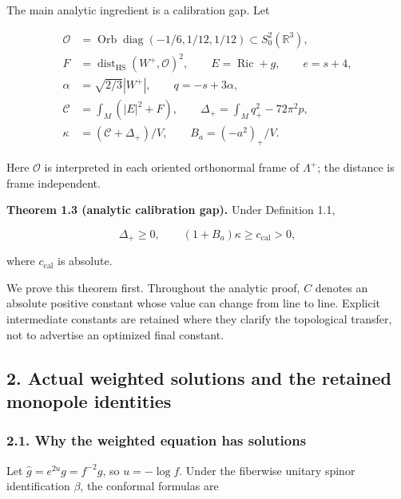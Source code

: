 \documentclass[
  10pt,
]{article}
\begin{document}
The main analytic ingredient is a calibration gap. Let

\[
 \begin{aligned}
 \mathcal O&=\operatorname{Orb}\operatorname{diag}
                    (-1/6,1/12,1/12)\subset S^2_0(\mathbb R^3),\\
 F&=\operatorname{dist}_{\mathrm{HS}}(W^+,\mathcal O)^2,\qquad
 E=\operatorname{Ric}+g,\qquad e=s+4,\\
 \alpha&=\sqrt{2/3}|W^+|,\qquad q=-s+3\alpha,\\
 \mathcal C&=\int_M(|E|^2+F),\qquad
 \Delta_+=\int_Mq_+^2-72\pi^2p,\\
 \kappa&=(\mathcal C+\Delta_+)/V,\qquad
 B_a=(-a^2)_+/V.
 \end{aligned}                                              \tag{1.7}
\]

Here \(\mathcal O\) is interpreted in each oriented orthonormal frame of
\(\Lambda^+\); the distance is frame independent.

\textbf{Theorem 1.3 (analytic calibration gap).} Under Definition 1.1,

\[
 \Delta_+\ge0,\qquad (1+B_a)\kappa\ge c_{\mathrm{cal}}>0, \tag{1.8}
\]

where \(c_{\mathrm{cal}}\) is absolute.

We prove this theorem first. Throughout the analytic proof, \(C\)
denotes an absolute positive constant whose value can change from line
to line. Explicit intermediate constants are retained where they clarify
the topological transfer, not to advertise an optimized final constant.

\hypertarget{actual-weighted-solutions-and-the-retained-monopole-identities}{%
\subsection{2. Actual weighted solutions and the retained monopole
identities}\label{actual-weighted-solutions-and-the-retained-monopole-identities}}

\hypertarget{why-the-weighted-equation-has-solutions}{%
\subsubsection{2.1. Why the weighted equation has
solutions}\label{why-the-weighted-equation-has-solutions}}

Let \(\widehat g=e^{2u}g=f^{-2}g\), so \(u=-\log f\). Under the
fiberwise unitary spinor identification \(\beta\), the conformal
formulas are
\end{document}
